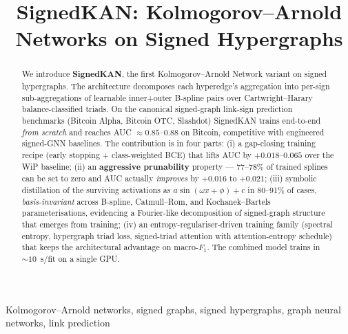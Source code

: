 \documentclass[conference]{IEEEtran}
\begin{document}
\title{SignedKAN: Kolmogorov--Arnold Networks on Signed Hypergraphs}

\author{
}

\maketitle

\begin{abstract}
We introduce \textbf{SignedKAN}, the first Kolmogorov--Arnold Network
variant on signed hypergraphs. The architecture decomposes each
hyperedge's aggregation into per-sign sub-aggregations of learnable
inner+outer B-spline pairs over Cartwright--Harary
balance-classified triads. On the canonical signed-graph link-sign
prediction benchmarks (Bitcoin Alpha, Bitcoin OTC, Slashdot)
SignedKAN trains end-to-end \emph{from scratch} and reaches AUC
$\approx\!0.85$--$0.88$ on Bitcoin, competitive with engineered
signed-GNN baselines. The contribution is in four parts: (i) a
gap-closing training recipe (early stopping + class-weighted BCE)
that lifts AUC by $+0.018$--$0.065$ over the WiP baseline; (ii) an
\textbf{aggressive prunability} property — 77--78\% of trained
splines can be set to zero and AUC actually \emph{improves} by
$+0.016$ to $+0.021$; (iii) symbolic distillation of the surviving
activations as $a\sin(\omega x + \phi) + c$ in 80--91\% of cases,
\emph{basis-invariant} across B-spline, Catmull--Rom, and
Kochanek--Bartels parameterisations, evidencing a Fourier-like
decomposition of signed-graph structure that emerges from training;
(iv) an entropy-regulariser-driven training family (spectral
entropy, hypergraph triad loss, signed-triad attention with
attention-entropy schedule) that keeps the architectural advantage
on macro-$F_1$. The combined model trains in $\sim\!10$~s/fit on a
single GPU.
\end{abstract}

\begin{IEEEkeywords}
Kolmogorov--Arnold networks, signed graphs, signed hypergraphs,
graph neural networks, link prediction
\end{IEEEkeywords}










\end{document}
